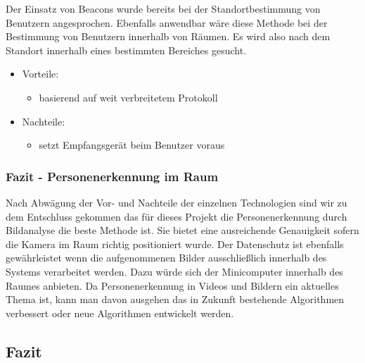 Der Einsatz von Beacons wurde bereits bei der Standortbestimmung von Benutzern
angesprochen. Ebenfalls anwendbar wäre diese Methode bei der Bestimmung von
Benutzern innerhalb von Räumen.
Es wird also nach dem Standort innerhalb eines bestimmten Bereiches gesucht. 

\begin{itemize}
	\item Vorteile:
	\begin{itemize}
		\item basierend auf weit verbreitetem Protokoll
	\end{itemize}
	\item Nachteile:
	\begin{itemize}
		\item setzt Empfangsgerät beim Benutzer voraus
	\end{itemize}
\end{itemize}


\subsubsection{Fazit - Personenerkennung im Raum}
\label{sec:Fazit - Personenerkennung im Raum}

Nach Abwägung der Vor- und Nachteile der einzelnen Technologien sind wir zu dem
Entschluss gekommen das für dieses Projekt die Personenerkennung durch
Bildanalyse die beste Methode ist. Sie bietet eine ausreichende Genauigkeit
sofern die Kamera im Raum richtig positioniert wurde. Der Datenschutz ist
ebenfalls gewährleistet wenn die aufgenommenen Bilder ausschließlich innerhalb
des Systems verarbeitet werden. Dazu würde sich der Minicomputer innerhalb des
Raumes anbieten. Da Personenerkennung in Videos und Bildern ein aktuelles Thema
ist, kann man davon ausgehen das in Zukunft bestehende Algorithmen verbessert
oder neue Algorithmen entwickelt werden.


\subsection{Fazit}
\label{Fazit}

